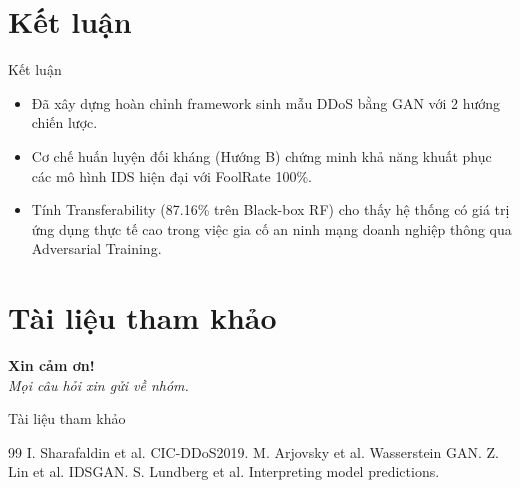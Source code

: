 \documentclass[aspectratio=169,11pt]{beamer}
\begin{document}
\section{Kết luận}

\begin{frame}{Kết luận}
  \begin{itemize}\setlength\itemsep{6pt}
    \item Đã xây dựng hoàn chỉnh framework sinh mẫu DDoS bằng GAN với
          2 hướng chiến lược.
    \item Cơ chế huấn luyện đối kháng (Hướng B) chứng minh khả năng
          khuất phục các mô hình IDS hiện đại với FoolRate 100\%.
    \item Tính Transferability (87.16\% trên Black-box RF) cho thấy hệ
          thống có giá trị ứng dụng thực tế cao trong việc gia cố an ninh
          mạng doanh nghiệp thông qua Adversarial Training.
  \end{itemize}
\end{frame}

\section{Tài liệu tham khảo}

\begin{frame}[plain]
  \vfill
  \centering
  \Huge \textbf{Xin cảm ơn!}\\[12pt]
  \normalsize \textit{Mọi câu hỏi xin gửi về nhóm.}
  \vfill
\end{frame}

\begin{frame}[allowframebreaks]{Tài liệu tham khảo}
  \footnotesize
  \begin{thebibliography}{99}
     I. Sharafaldin et al. CIC-DDoS2019.
       M. Arjovsky et al. Wasserstein GAN.
            Z. Lin et al. IDSGAN.
       S. Lundberg et al. Interpreting model predictions.
  \end{thebibliography}
\end{frame}
\end{document}
